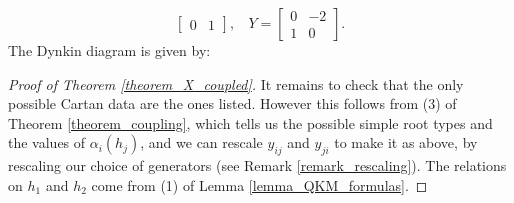 \documentclass[12pt, a4paper, reqno]{amsart}
\theoremstyle{definition}
\theoremstyle{definition}
\theoremstyle{definition}
\numberwithin{theorem}{section}
\numberwithin{lemma}{section}
\numberwithin{remark}{section}
\numberwithin{definition}{section}
\numberwithin{corollary}{section}
\numberwithin{proposition}{section}
\numberwithin{example}{section}
\begin{document}
\begin{theorem}
\begin{enumerate}
\[\begin{bmatrix}
				0 & 1
			\end{bmatrix}, \ \ \ \ 
			Y=\begin{bmatrix}
				0 & -2\\ 1 & 0
			\end{bmatrix}.
			\]
			The Dynkin diagram is given by:
			\begin{center}
			\end{center}
		\end{enumerate}
	\end{theorem}
    
	\begin{proof}[Proof of Theorem \ref{theorem_X_coupled}]
		It remains to check that the only possible Cartan data are the ones listed.  However this follows from (3) of Theorem \ref{theorem_coupling}, which tells us the possible simple root types and the values of $\alpha_i(h_j)$, and we can rescale $y_{ij}$ and $y_{ji}$ to make it as above, by rescaling our choice of generators (see Remark \ref{remark_rescaling}).  The relations on $h_1$ and $h_2$ come from (1) of Lemma \ref{lemma_QKM_formulas}.
	\end{proof}
	
	
	
	
\end{document}
